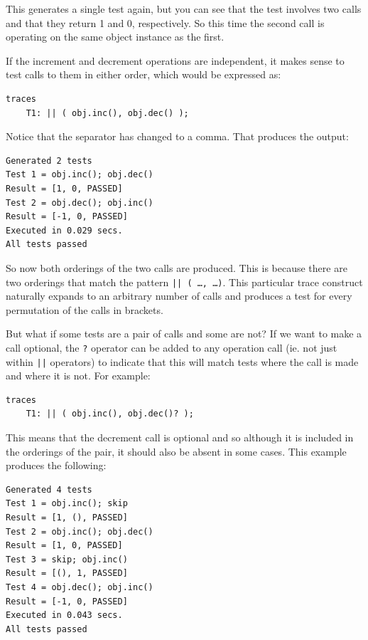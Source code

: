 \documentclass{overturerepchap}
\begin{document}
This generates a single test again, but you can see that the test involves two
calls and that they return 1 and 0, respectively. So this time the second call
is operating on the same object instance as the first.

If the increment and decrement operations are independent, it makes sense to
test calls to them in either order, which would be expressed as:

\small
\begin{lstlisting}
traces
    T1: || ( obj.inc(), obj.dec() );
\end{lstlisting}
\normalsize

Notice that the separator has changed to a comma. That produces the output:

\small
\begin{verbatim}
Generated 2 tests
Test 1 = obj.inc(); obj.dec()
Result = [1, 0, PASSED]
Test 2 = obj.dec(); obj.inc()
Result = [-1, 0, PASSED]
Executed in 0.029 secs. 
All tests passed
\end{verbatim}
\normalsize

So now both orderings of the two calls are produced. This is because there are
two orderings that match the pattern \texttt{|| ( \ldots, \ldots )}. This
particular trace construct naturally expands to an arbitrary number of calls and
produces a test for every permutation of the calls in brackets.

But what if some tests are a pair of calls and some are not? If we want to make
a call optional, the \texttt{?} operator can be added to any operation call
(ie. not just within \texttt{||} operators) to indicate that this will match
tests where the call is made and where it is not. For example:

\small
\begin{lstlisting}
traces
    T1: || ( obj.inc(), obj.dec()? );
\end{lstlisting}
\normalsize

This means that the decrement call is optional and so although it is included in
the orderings of the pair, it should also be absent in some cases. This
example produces the following:

\small
\begin{verbatim}
Generated 4 tests
Test 1 = obj.inc(); skip
Result = [1, (), PASSED]
Test 2 = obj.inc(); obj.dec()
Result = [1, 0, PASSED]
Test 3 = skip; obj.inc()
Result = [(), 1, PASSED]
Test 4 = obj.dec(); obj.inc()
Result = [-1, 0, PASSED]
Executed in 0.043 secs. 
All tests passed
\end{verbatim}
\normalsize
\end{document}

